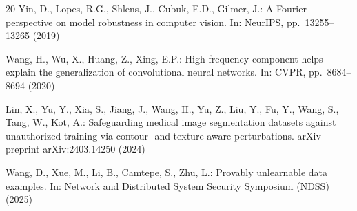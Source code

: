 \documentclass[runningheads]{llncs}
\begin{document}
\begin{thebibliography}{20}
Yin, D., Lopes, R.G., Shlens, J., Cubuk, E.D., Gilmer, J.:
A Fourier perspective on model robustness in computer vision.
In: NeurIPS, pp.~13255--13265 (2019)

Wang, H., Wu, X., Huang, Z., Xing, E.P.:
High-frequency component helps explain the generalization of convolutional neural networks.
In: CVPR, pp.~8684--8694 (2020)

Lin, X., Yu, Y., Xia, S., Jiang, J., Wang, H., Yu, Z., Liu, Y., Fu, Y., Wang, S., Tang, W., Kot, A.:
Safeguarding medical image segmentation datasets against unauthorized training via contour- and texture-aware perturbations.
arXiv preprint arXiv:2403.14250 (2024)

Wang, D., Xue, M., Li, B., Camtepe, S., Zhu, L.:
Provably unlearnable data examples.
In: Network and Distributed System Security Symposium (NDSS) (2025)

\end{thebibliography}
\end{document}
